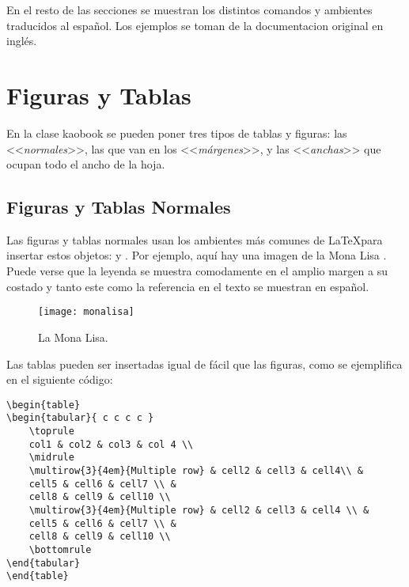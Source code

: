 En el resto de las secciones se muestran los distintos comandos y ambientes traducidos al español. Los ejemplos se toman de la documentacion original en inglés.
    
\section{Figuras y Tablas}
En la clase kaobook se pueden poner tres tipos de tablas y figuras: las <<\emph{normales}>>, las que van en los <<\emph{márgenes}>>, y las <<\emph{anchas}>> que ocupan todo el ancho de la hoja.

\subsection{Figuras y Tablas Normales}
 

Las figuras y tablas normales usan los ambientes más comunes de \LaTeX para insertar estos objetos:  y . Por ejemplo, aquí hay una imagen de la Mona Lisa . Puede verse que la leyenda se muestra comodamente en el amplio margen a su costado y tanto este como la referencia en el texto se muestran en español.

\begin{figure}[hb]
	\texttt{[image: monalisa]}
	\caption[La Mona Lisa]{La Mona Lisa. \blindtext}
\end{figure}

Las tablas pueden ser insertadas igual de fácil que las figuras, como se ejemplifica en el siguiente código:

\begin{lstlisting}[caption={Leyenda de un Código.}]
\begin{table}
\begin{tabular}{ c c c c }
	\toprule
	col1 & col2 & col3 & col 4 \\
	\midrule
	\multirow{3}{4em}{Multiple row} & cell2 & cell3 & cell4\\ &
	cell5 & cell6 & cell7 \\ &
	cell8 & cell9 & cell10 \\
	\multirow{3}{4em}{Multiple row} & cell2 & cell3 & cell4 \\ &
	cell5 & cell6 & cell7 \\ &
	cell8 & cell9 & cell10 \\
	\bottomrule
\end{tabular}
\end{table}
\end{lstlisting}

